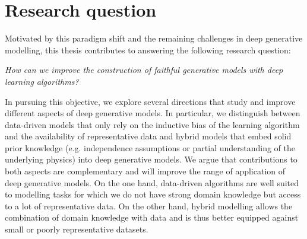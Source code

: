\section{Research question}

Motivated by this paradigm shift and the remaining challenges in deep generative modelling, this thesis contributes to answering the following research question:
\begin{center}
  \textit{How can we improve the construction of faithful generative models with deep learning algorithms?}
\end{center}
In pursuing this objective, we explore several directions that study and improve different aspects of deep generative models. In particular, we distinguish between data-driven models that only rely on the inductive bias of the learning algorithm and the availability of representative data and hybrid models that embed solid prior knowledge (e.g. independence assumptions or partial understanding of the underlying physics) into deep generative models. We argue that contributions to both aspects are complementary and will improve the range of application of deep generative models. On the one hand, data-driven algorithms are well suited to modelling tasks for which we do not have strong domain knowledge but access to a lot of representative data. On the other hand, hybrid modelling allows the combination of domain knowledge with data and is thus better equipped against small or poorly representative datasets.





